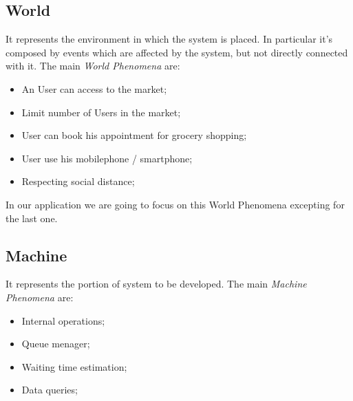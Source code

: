 \subsection{World}

It represents the environment in which the system is placed. In particular it's composed by events which are affected by the system, but not directly connected with it.
The main \textit{World Phenomena} are:

\begin{itemize}
\item An User can access to the market;
\item Limit number of Users in the market;
\item User can book his appointment for grocery shopping;
\item User use his mobilephone / smartphone;
\item Respecting social distance;
\end{itemize}

In our application we are going to focus on this World Phenomena excepting for the last one.

\subsection{Machine}
It represents the portion of system to be developed.
The main \textit{Machine Phenomena} are:
\begin{itemize}
\item Internal operations;
\item Queue menager;
\item Waiting time estimation;
\item Data queries;
\end{itemize}
